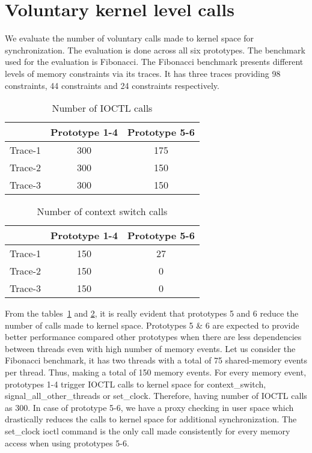 \section{Voluntary kernel level calls}

We evaluate the number of voluntary calls made to kernel space for synchronization. 
The evaluation is done across all six prototypes. 
The benchmark used for the evaluation is Fibonacci. 
The Fibonacci benchmark presents different levels of memory constraints via its traces. 
It has three traces providing 98 constraints, 44 constraints and 24 constraints respectively.

\begin{table}
\begin{center}
 \begin{tabular}{|c c c|} 
 \hline
 & Prototype 1-4 & Prototype 5-6\\ %
 \hline
 Trace-1 & 300 & 175\\ 
 Trace-2 & 300 & 150\\
 Trace-3 & 300 & 150\\
 \hline
\end{tabular}
\end{center}
\caption{Number of IOCTL calls}
\label{num_ioctls}
\end{table}
\begin{table}
\begin{center}
 \begin{tabular}{|c c c|} 
 \hline
 & Prototype 1-4 & Prototype 5-6\\ %
 \hline
 Trace-1 & 150 & 27\\ 
 Trace-2 & 150 & 0\\
 Trace-3 & 150 & 0\\
 \hline
\end{tabular}
\end{center}
\caption{Number of context switch calls}
\label{num_ctxts}
\end{table}

From the tables~\ref{num_ioctls} and \ref{num_ctxts}, it is really evident that prototypes 5 and 6 reduce the number of calls made to kernel space. 
Prototypes 5 \& 6 are expected to provide better performance compared other prototypes when there are less dependencies between threads even with high number of memory events. 
Let us consider the Fibonacci benchmark, it has two threads with a total of 75 shared-memory events per thread. 
Thus, making a total of 150 memory events. 
For every memory event, prototypes 1-4 trigger IOCTL calls to kernel space for context\_switch, signal\_all\_other\_threads or set\_clock. 
Therefore, having number of IOCTL calls as 300. 
In case of prototype 5-6, we have a proxy checking in user space which drastically reduces the calls to kernel space for additional synchronization. 
The set\_clock ioctl command is the only call made consistently for every memory access when using prototypes 5-6.

